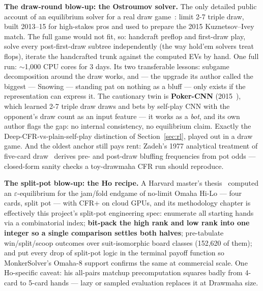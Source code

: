 \textbf{The draw-round blow-up: the Ostroumov solver.} The only detailed public account of an equilibrium solver for a real draw game~\cite{ostroumov}: limit 2-7 triple draw, built 2013--15 for high-stakes pros and used to prepare the 2015 Kuznetsov--Ivey match. The full game would not fit, so: handcraft preflop and first-draw play, solve every post-first-draw subtree independently (the way hold'em solvers treat flops), iterate the handcrafted trunk against the computed EVs by hand. One full run: $\sim$1{,}000 CPU cores for 3 days. Its two transferable lessons: subgame decomposition around the draw works, and --- the upgrade its author called the biggest ---  Snowing --- standing pat on nothing as a bluff --- only exists if the representation can express it. The cautionary twin is \textbf{Poker-CNN} (2015~\cite{pokercnn}), which learned 2-7 triple draw draws and bets by self-play CNN with the opponent's draw count as an input feature --- it works as a \emph{bot}, and its own author flags the gap: no internal consistency, no equilibrium claim. Exactly the Deep-CFR-vs-plain-self-play distinction of Section~\ref{sec:rl}, played out in a draw game. And the oldest anchor still pays rent: Zadeh's 1977 analytical treatment of five-card draw~\cite{zadeh} derives pre- and post-draw bluffing frequencies from pot odds --- closed-form sanity checks a toy-drawmaha CFR run should reproduce.

\textbf{The split-pot blow-up: the Ho recipe.} A Harvard master's thesis~\cite{ho2015} computed an $\varepsilon$-equilibrium for the jam/fold endgame of no-limit Omaha Hi-Lo --- four cards, split pot --- with CFR+ on cloud GPUs, and its methodology chapter is effectively this project's split-pot engineering spec: enumerate all starting hands via a combinatorial index; \textbf{bit-pack the high rank and low rank into one integer so a single comparison settles both halves}; pre-tabulate win/split/scoop outcomes over suit-isomorphic board classes (152{,}620 of them); and put every drop of split-pot logic in the terminal payoff function so  MonkerSolver's Omaha-8 support confirms the same at commercial scale. One Ho-specific caveat: his all-pairs matchup precomputation squares badly from 4-card to 5-card hands --- lazy or sampled evaluation replaces it at Drawmaha size.


